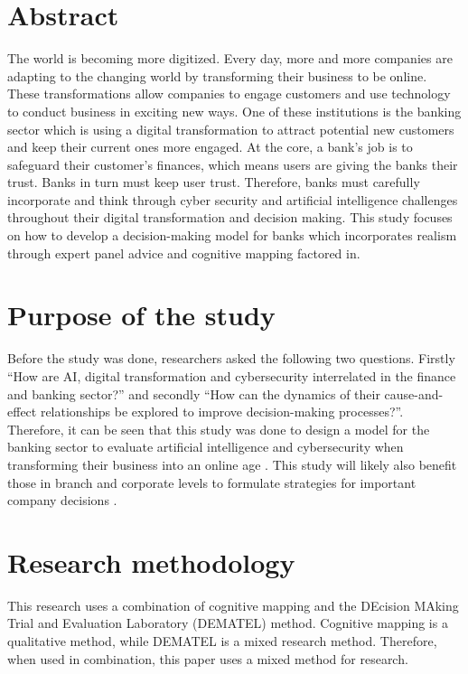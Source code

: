 \documentclass{article}
\begin{document}
\section*{Abstract}
The world is becoming more digitized. Every day, more and more companies are adapting to the changing world by transforming their business to be online. These transformations allow companies to engage customers and use technology to conduct business in exciting new ways. One of these institutions is the banking sector which is using a digital transformation to attract potential new customers and keep their current ones more engaged. At the core, a bank's job is to safeguard their customer’s finances, which means users are giving the banks their trust. Banks in turn must keep user trust. Therefore, banks must carefully incorporate and think through cyber security and artificial intelligence challenges throughout their digital transformation and decision making. This study focuses on how to develop a decision-making model for banks which incorporates realism through expert panel advice and cognitive mapping factored in. \\

\section*{Purpose of the study}
Before the study was done, researchers asked the following two questions. Firstly “How are AI, digital transformation and cybersecurity interrelated in the finance and banking sector?” and secondly “How can the dynamics of their cause-and-effect relationships be explored to improve decision-making processes?”. Therefore, it can be seen that this study was done to design a model for the banking sector to evaluate artificial intelligence and cybersecurity when transforming their business into an online age \cite{SHAIKH20171030}. This study will likely also benefit those in branch and corporate levels to formulate strategies for important company decisions \cite{eden2004cognitive}. \\
\section*{Research methodology}
This research uses a combination of cognitive mapping and the DEcision MAking Trial and Evaluation Laboratory (DEMATEL) method. Cognitive mapping is a qualitative method, while DEMATEL is a mixed research method. Therefore, when used in combination, this paper uses a mixed method for research.\\
\end{document}
